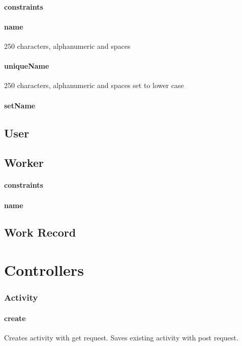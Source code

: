 \documentclass[12pt]{article}
\begin{document}
\paragraph{constraints}
\paragraph{name} 250 characters, alphanumeric and spaces 
\paragraph{uniqueName} 250 characters, alphanumeric and spaces  set to lower case
\paragraph{setName}

\setcounter{paragraph}{0}
\subsection{User}\label{sec:DUser}
\subsection{Worker}\label{sec:DWorker}
\paragraph{constraints}
\paragraph{name}

\setcounter{paragraph}{0}
\subsection{Work Record}\label{sec:DWork Record}

\section{Controllers}\label{sec:Controllers}

\subsubsection{Activity}\label{sec:CActivity}
\paragraph{create} Creates activity with get request. Saves existing activity with post request.
\end{document}
